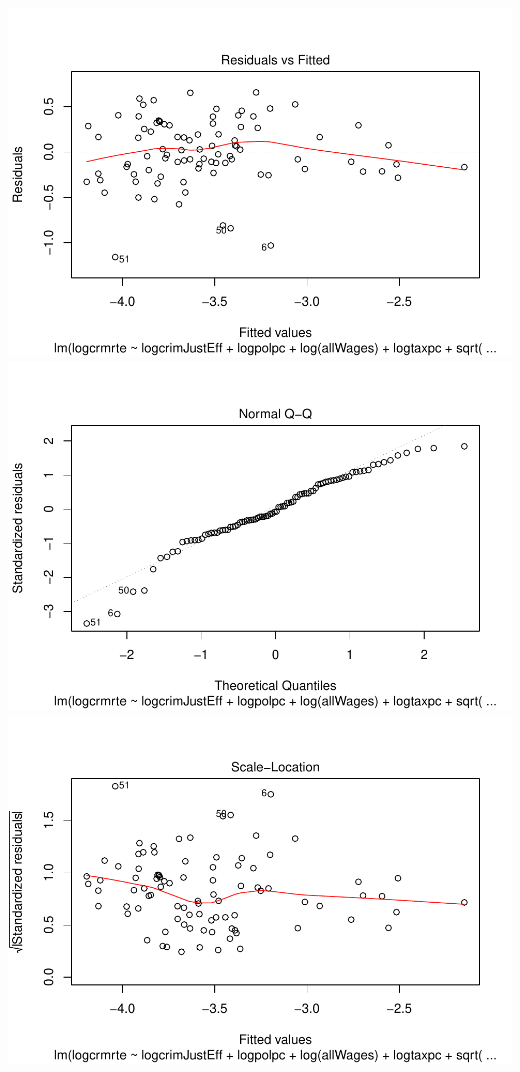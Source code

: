 \documentclass[]{article}
\begin{document}
\includegraphics{Bagnard_Gaustad_Hartman_Leung_Lab_3_files/figure-latex/unnamed-chunk-91-1.pdf}
\includegraphics{Bagnard_Gaustad_Hartman_Leung_Lab_3_files/figure-latex/unnamed-chunk-91-2.pdf}
\includegraphics{Bagnard_Gaustad_Hartman_Leung_Lab_3_files/figure-latex/unnamed-chunk-91-3.pdf}
\end{document}
